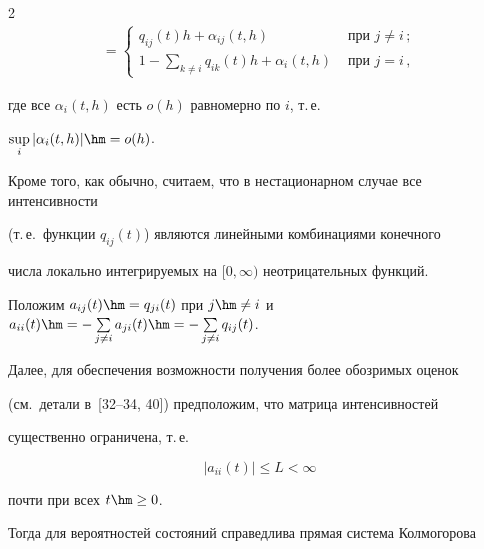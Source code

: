 \begin{multicols}{2}
\begin{multline*}
{}=  \begin{cases}

q_{ij}\left( t\right)  h+\alpha_{ij}\left(t, h\right) & \mbox { при }j\neq i\,;\\

1-\sum\limits_{k\neq i}q_{ik}\left( t\right)  h+\alpha_{i}\left(

t,h\right) & \mbox { при } j=i\,,

\end{cases}


\end{multline*}

где все  $\alpha_{i}(t,h)$ есть $o(h)$ равномерно по  $i$, т.\,е.\

$\sup\limits_i |\alpha_i(t,h)| \hm= o(h)$.



Кроме того, как обычно, считаем, что в нестационарном случае все интенсивности

(т.\,е.\ функции $q_{ij}\left( t\right) $) являются линейными комбинациями конечного

чис\-ла локально интегрируемых на $[0,\infty)$ не\-от\-ри\-ца\-тель\-ных функций.



Положим $a_{ij}(t) \hm=  q_{ji}(t)$ при $j\hm\neq i$ и $a_{ii}(t)\hm =

-\sum\limits_{j\neq i} a_{ji}(t) \hm= -\sum\limits_{j\neq i} q_{ij}(t)$.



Далее, для обеспечения возможности получения более обозримых оценок

(см.\ детали в~[32--34, 40]) предположим, что матрица интенсивностей

существенно ограничена, т.\,е.\

\begin{equation}

|a_{ii}(t)| \le L < \infty

\label{0102-1}

\end{equation}

\noindent почти при всех $t \hm\ge 0$.





Тогда для вероятностей состояний справедлива прямая система Колмогорова

\begin{equation} \label{ur01}


\end{equation}
\end{multicols}
